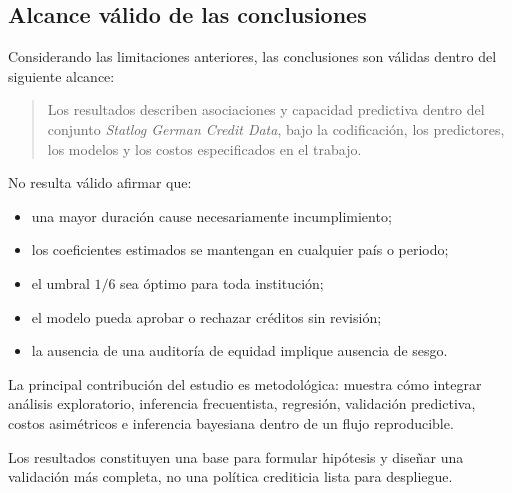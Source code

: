 \subsection{Alcance válido de las conclusiones}

Considerando las limitaciones anteriores, las conclusiones son válidas
dentro del siguiente alcance:

\begin{quote}
Los resultados describen asociaciones y capacidad predictiva dentro del
conjunto \textit{Statlog German Credit Data}, bajo la codificación, los
predictores, los modelos y los costos especificados en el trabajo.
\end{quote}

No resulta válido afirmar que:

\begin{itemize}
    \item una mayor duración cause necesariamente incumplimiento;

    \item los coeficientes estimados se mantengan en cualquier país o
    periodo;

    \item el umbral \(1/6\) sea óptimo para toda institución;

    \item el modelo pueda aprobar o rechazar créditos sin revisión;

    \item la ausencia de una auditoría de equidad implique ausencia de
    sesgo.
\end{itemize}

La principal contribución del estudio es metodológica: muestra cómo
integrar análisis exploratorio, inferencia frecuentista, regresión,
validación predictiva, costos asimétricos e inferencia bayesiana dentro de
un flujo reproducible.

Los resultados constituyen una base para formular hipótesis y diseñar una
validación más completa, no una política crediticia lista para
despliegue.

